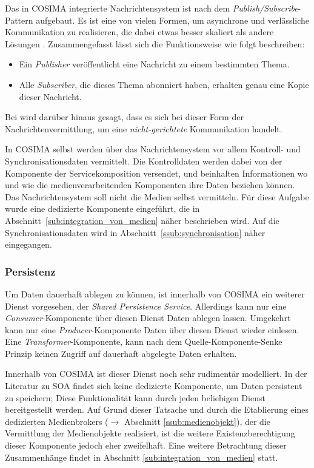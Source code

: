   Das in COSIMA integrierte Nachrichtensystem ist nach dem \emph{Publish/Subscribe}-Pattern \citep[S. 106]{enterprise_integration_patterns} aufgebaut. Es ist eine von vielen Formen, um asynchrone und verlässliche Kommunikation zu realisieren, die dabei etwas besser skaliert als andere Lösungen \citep[S. 69]{web_services_principles_and_technology}. Zusammengefasst lässt sich die Funktionsweise wie folgt beschreiben:
  
  \begin{itemize}
    \item Ein \emph{Publisher} veröffentlicht eine Nachricht zu einem bestimmten Thema.
    \item Alle \emph{Subscriber}, die dieses Thema abonniert haben, erhalten genau eine Kopie dieser Nachricht.
  \end{itemize}
  
  Bei \citep[S. 127]{soa_goes_real} wird darüber hinaus gesagt, dass es sich bei dieser Form der Nachrichtenvermittlung, um eine \emph{nicht-gerichtete} Kommunikation handelt.
  
  In COSIMA selbst werden über das Nachrichtensystem vor allem Kontroll- und Synchronisationsdaten vermittelt. Die Kontrolldaten werden dabei von der Komponente der Servicekomposition versendet, und beinhalten Informationen wo und wie die medienverarbeitenden Komponenten ihre Daten beziehen können. Das Nachrichtensystem soll nicht die Medien selbst vermitteln. Für diese Aufgabe wurde eine dedizierte Komponente eingeführt, die in Abschnitt~\ref{sub:integration_von_medien} näher beschrieben wird. Auf die Synchronisationsdaten wird in Abschnitt~\ref{ssub:synchronisation} näher eingegangen.
  

\subsubsection{Persistenz} %
\label{ssub:persistenz}

  Um Daten dauerhaft ablegen zu können, ist innerhalb von COSIMA ein weiterer Dienst vorgesehen, der \emph{Shared Persistence Service}. Allerdings kann nur eine \emph{Consumer}-Komponente über diesen Dienst Daten ablegen lassen. Umgekehrt kann nur eine \emph{Producer}-Komponente Daten über diesen Dienst wieder einlesen. Eine \emph{Transformer}-Komponente, kann nach dem Quelle-Komponente-Senke Prinzip keinen Zugriff auf dauerhaft abgelegte Daten erhalten.
  
  Innerhalb von COSIMA ist dieser Dienst noch sehr rudimentär modelliert. In der Literatur zu SOA findet sich keine dedizierte Komponente, um Daten persistent zu speichern; Diese Funktionalität kann durch jeden beliebigen Dienst bereitgestellt werden. Auf Grund dieser Tatsache und durch die Etablierung eines dedizierten Medienbrokers ($\to$ Abschnitt \ref{ssub:medienobjekt}), der die Vermittlung der Medienobjekte realisiert, ist die weitere Existenzberechtigung dieser Komponente jedoch eher zweifelhaft. Eine weitere Betrachtung dieser Zusammenhänge findet in Abschnitt \ref{sub:integration_von_medien} statt.
  
